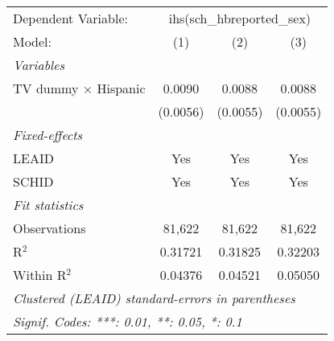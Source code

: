 \begin{tabular}{lccc}
\tabularnewline\midrule\midrule
Dependent Variable:&\multicolumn{3}{c}{ihs(sch\_hbreported\_sex)}\\
Model:&(1) & (2) & (3)\\
\midrule \emph{Variables}&   &   &  \\
TV dummy $\times$ Hispanic & 0.0090 & 0.0088 & 0.0088\\
  &(0.0056) & (0.0055) & (0.0055)\\
\midrule \emph{Fixed-effects}&   &   &  \\
LEAID & Yes & Yes & Yes\\
SCHID & Yes & Yes & Yes\\
\midrule \emph{Fit statistics}&  & & \\
Observations & 81,622&81,622&81,622\\
R$^2$ & 0.31721&0.31825&0.32203\\
Within R$^2$ & 0.04376&0.04521&0.05050\\
\midrule\midrule\multicolumn{4}{l}{\emph{Clustered (LEAID) standard-errors in parentheses}}\\
\multicolumn{4}{l}{\emph{Signif. Codes: ***: 0.01, **: 0.05, *: 0.1}}\\
\end{tabular}


